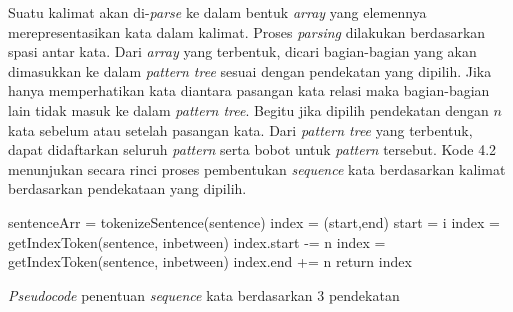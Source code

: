 Suatu kalimat akan di-\textit{parse} ke dalam bentuk \textit{array} yang elemennya merepresentasikan kata dalam kalimat. Proses \textit{parsing} dilakukan berdasarkan spasi antar kata. Dari \textit{array} yang terbentuk, dicari bagian-bagian yang akan dimasukkan ke dalam \textit{pattern tree} sesuai dengan pendekatan yang dipilih. Jika hanya memperhatikan kata diantara pasangan kata relasi maka bagian-bagian lain tidak masuk ke dalam \textit{pattern tree}. Begitu jika dipilih pendekatan dengan $n$ kata sebelum atau setelah pasangan kata. Dari \textit{pattern tree} yang terbentuk, dapat didaftarkan seluruh \textit{pattern} serta bobot untuk \textit{pattern} tersebut. Kode 4.2 menunjukan secara rinci proses pembentukan \textit{sequence} kata berdasarkan kalimat berdasarkan pendekataan yang dipilih. 
%  
%  
%  
%
\begin{kode} 

   {
    
    \BlankLine
    sentenceArr = tokenizeSentence(sentence)\;
    index = (start,end)\;
     {
       {
         {
           {
            start = i\;
          } 
        }
      }
    }  {
      index = getIndexToken(sentence, inbetween)\;
       {
        index.start -= n\;
      } 
    }  {
      index = getIndexToken(sentence, inbetween)\;
       {
        index.end += n\;
      } 
    }
    return index\;
  }
  \label{code:pembentukan-ptree}  
  \caption{\textit{Pseudocode} penentuan \textit{sequence} kata berdasarkan 3 pendekatan}  
\end{kode} 

